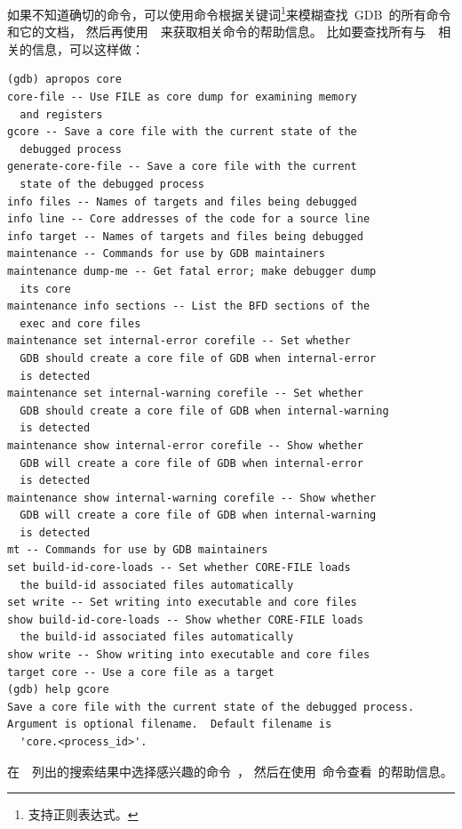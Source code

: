 如果不知道确切的命令，可以使用命令根据关键词\footnote{支持正则表达式。}来模糊查找~GDB~的所有命令和它的文档，
然后再使用~~来获取相关命令的帮助信息。
比如要查找所有与~~相关的信息，可以这样做：
\begin{lstlisting}
(gdb) apropos core
core-file -- Use FILE as core dump for examining memory
  and registers
gcore -- Save a core file with the current state of the
  debugged process
generate-core-file -- Save a core file with the current
  state of the debugged process
info files -- Names of targets and files being debugged
info line -- Core addresses of the code for a source line
info target -- Names of targets and files being debugged
maintenance -- Commands for use by GDB maintainers
maintenance dump-me -- Get fatal error; make debugger dump
  its core
maintenance info sections -- List the BFD sections of the
  exec and core files
maintenance set internal-error corefile -- Set whether
  GDB should create a core file of GDB when internal-error
  is detected
maintenance set internal-warning corefile -- Set whether
  GDB should create a core file of GDB when internal-warning
  is detected
maintenance show internal-error corefile -- Show whether
  GDB will create a core file of GDB when internal-error
  is detected
maintenance show internal-warning corefile -- Show whether
  GDB will create a core file of GDB when internal-warning
  is detected
mt -- Commands for use by GDB maintainers
set build-id-core-loads -- Set whether CORE-FILE loads
  the build-id associated files automatically
set write -- Set writing into executable and core files
show build-id-core-loads -- Show whether CORE-FILE loads
  the build-id associated files automatically
show write -- Show writing into executable and core files
target core -- Use a core file as a target
(gdb) help gcore
Save a core file with the current state of the debugged process.
Argument is optional filename.  Default filename is
  'core.<process_id>'.
\end{lstlisting}

在~~列出的搜索结果中选择感兴趣的命令~，
然后在使用~命令查看~的帮助信息。

